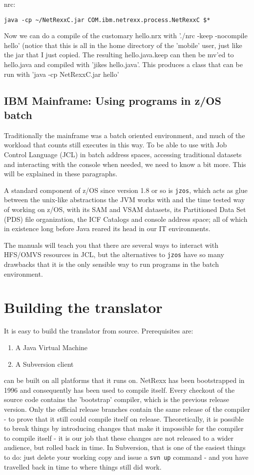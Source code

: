 nrc:
\begin{verbatim}
java -cp ~/NetRexxC.jar COM.ibm.netrexx.process.NetRexxC $*
\end{verbatim}
Now we can do a compile of the customary hello.nrx with './nrc -keep -nocompile hello' (notice that this is all in the home directory of the 'mobile' user, just like the jar that I just copied. The resulting hello.java.keep can then be mv'ed to hello.java and compiled with 'jikes hello.java'. This produces a class that can be run with 'java -cp NetRexxC.jar hello'
\section{IBM Mainframe: Using \nr{} programs in z/OS batch}
Traditionally the mainframe was a batch oriented environment, and much
of the workload that counts still executes in this way. To be able to
use \nr{}with Job Control Language (JCL) in batch address spaces,
accessing traditional datasets and interacting with the console when
needed, we need to know a bit more. This will be explained in these paragraphs.

A standard component of z/OS since version 1.8 or so is \texttt{jzos},
which acts as glue between the unix-like abstractions the JVM works
with and the time tested way of working on z/OS, with its SAM and VSAM
datasets, its Partitioned Data Set (PDS) file organization, the ICF
Catalogs and console address space; all of which in existence long
before Java reared its head in our IT environments.

The manuals will teach you that there are several ways to
interact with HFS/OMVS resources in JCL, but the alternatives to
\texttt{jzos} have so many drawbacks that it is the only
sensible way to run \nr{} programs in the batch environment. 
\chapter{Building the \nr{} translator}
It is easy to build the \nr{} translator from source. Prerequisites
are:
\begin{enumerate}
\item A Java Virtual Machine
\item A Subversion client
\end{enumerate}
\nr{} can be built on all platforms that it runs on.  NetRexx has been
bootstrapped in 1996 and consequently has been used to compile
itself. Every checkout of the source code contains the 'bootstrap'
compiler, which is the previous release version. Only the official
release branches contain the same release of the compiler - to prove
that it still could compile itself on release. Theoretically, it is
possible to break things by introducing changes that make it
impossible for the compiler to compile itself - it is our job that
these changes are not released to a wider audience, but rolled back in
time. In Subversion, that is one of the easiest things to do: just
delete your working copy and issue a \texttt{svn up} command - and you
have travelled back in time to where things still did work.
